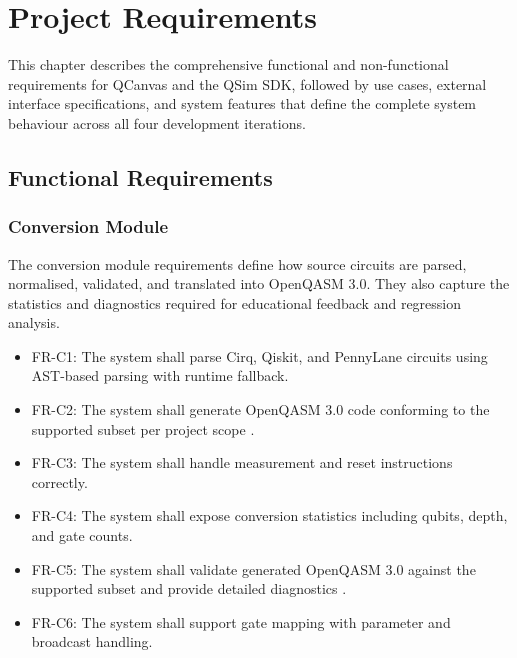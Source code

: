 \chapter{Project Requirements}
\label{ch:requirements}

This chapter describes the comprehensive functional and non-functional requirements for QCanvas and the QSim SDK, followed by use cases, external interface specifications, and system features that define the complete system behaviour across all four development iterations.

\section{Functional Requirements}

\subsection{Conversion Module}
The conversion module requirements define how source circuits are parsed, normalised, validated, and translated into OpenQASM 3.0. They also capture the statistics and diagnostics required for educational feedback and regression analysis.
\begin{itemize}
    \item FR-C1: The system shall parse Cirq, Qiskit, and PennyLane circuits using AST-based parsing with runtime fallback.
    \item FR-C2: The system shall generate OpenQASM 3.0 code conforming to the supported subset per project scope \cite{cross2021openqasm}.
    \item FR-C3: The system shall handle measurement and reset instructions correctly.
    \item FR-C4: The system shall expose conversion statistics including qubits, depth, and gate counts.
    \item FR-C5: The system shall validate generated OpenQASM 3.0 against the supported subset and provide detailed diagnostics \cite{cross2017openqasm}.
    \item FR-C6: The system shall support gate mapping with parameter and broadcast handling.
\end{itemize}

